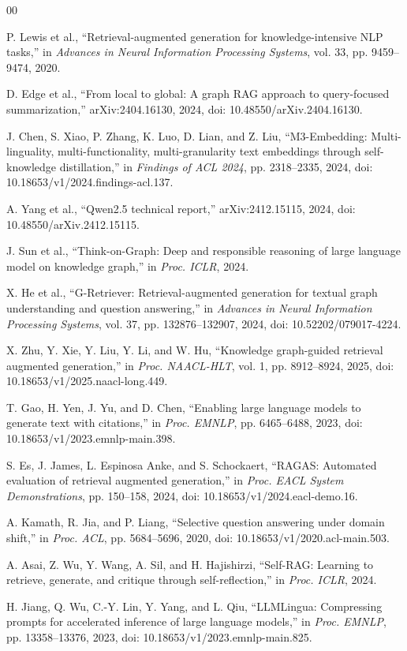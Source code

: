 \documentclass[conference]{IEEEtran}
\begin{document}
\begin{thebibliography}{00}

 P. Lewis et al., ``Retrieval-augmented generation for knowledge-intensive NLP tasks,'' in \emph{Advances in Neural Information Processing Systems}, vol. 33, pp. 9459--9474, 2020.

 D. Edge et al., ``From local to global: A graph RAG approach to query-focused summarization,'' arXiv:2404.16130, 2024, doi: 10.48550/arXiv.2404.16130.

 J. Chen, S. Xiao, P. Zhang, K. Luo, D. Lian, and Z. Liu, ``M3-Embedding: Multi-linguality, multi-functionality, multi-granularity text embeddings through self-knowledge distillation,'' in \emph{Findings of ACL 2024}, pp. 2318--2335, 2024, doi: 10.18653/v1/2024.findings-acl.137.

 A. Yang et al., ``Qwen2.5 technical report,'' arXiv:2412.15115, 2024, doi: 10.48550/arXiv.2412.15115.

 J. Sun et al., ``Think-on-Graph: Deep and responsible reasoning of large language model on knowledge graph,'' in \emph{Proc. ICLR}, 2024.

 X. He et al., ``G-Retriever: Retrieval-augmented generation for textual graph understanding and question answering,'' in \emph{Advances in Neural Information Processing Systems}, vol. 37, pp. 132876--132907, 2024, doi: 10.52202/079017-4224.

 X. Zhu, Y. Xie, Y. Liu, Y. Li, and W. Hu, ``Knowledge graph-guided retrieval augmented generation,'' in \emph{Proc. NAACL-HLT}, vol. 1, pp. 8912--8924, 2025, doi: 10.18653/v1/2025.naacl-long.449.

 T. Gao, H. Yen, J. Yu, and D. Chen, ``Enabling large language models to generate text with citations,'' in \emph{Proc. EMNLP}, pp. 6465--6488, 2023, doi: 10.18653/v1/2023.emnlp-main.398.

 S. Es, J. James, L. Espinosa Anke, and S. Schockaert, ``RAGAS: Automated evaluation of retrieval augmented generation,'' in \emph{Proc. EACL System Demonstrations}, pp. 150--158, 2024, doi: 10.18653/v1/2024.eacl-demo.16.

 A. Kamath, R. Jia, and P. Liang, ``Selective question answering under domain shift,'' in \emph{Proc. ACL}, pp. 5684--5696, 2020, doi: 10.18653/v1/2020.acl-main.503.

 A. Asai, Z. Wu, Y. Wang, A. Sil, and H. Hajishirzi, ``Self-RAG: Learning to retrieve, generate, and critique through self-reflection,'' in \emph{Proc. ICLR}, 2024.

 H. Jiang, Q. Wu, C.-Y. Lin, Y. Yang, and L. Qiu, ``LLMLingua: Compressing prompts for accelerated inference of large language models,'' in \emph{Proc. EMNLP}, pp. 13358--13376, 2023, doi: 10.18653/v1/2023.emnlp-main.825.

\end{thebibliography}
\end{document}
